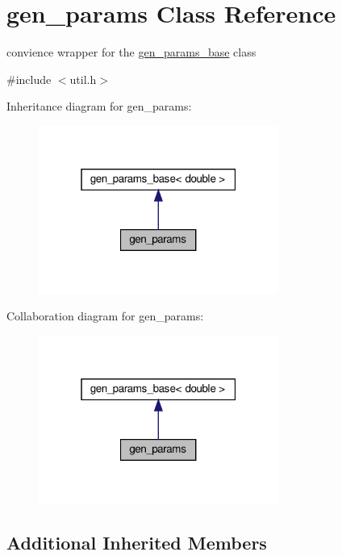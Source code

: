 \hypertarget{classgen__params}{}\section{gen\+\_\+params Class Reference}
\label{classgen__params}


convience wrapper for the \hyperlink{classgen__params__base}{gen\+\_\+params\+\_\+base} class  




{\ttfamily \#include $<$util.\+h$>$}



Inheritance diagram for gen\+\_\+params\+:\nopagebreak
\begin{figure}[H]
\begin{center}
\leavevmode
\includegraphics[width=223pt]{classgen__params__inherit__graph}
\end{center}
\end{figure}


Collaboration diagram for gen\+\_\+params\+:\nopagebreak
\begin{figure}[H]
\begin{center}
\leavevmode
\includegraphics[width=223pt]{classgen__params__coll__graph}
\end{center}
\end{figure}
\subsection*{Additional Inherited Members}


